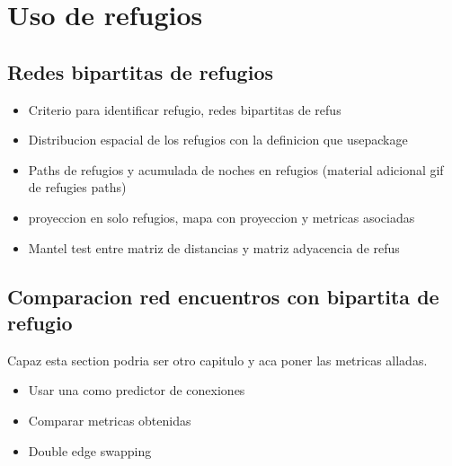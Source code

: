 \chapter{Uso de refugios}
\section{Redes bipartitas de refugios}
\begin{itemize}
    \item Criterio para identificar refugio, redes bipartitas de refus
    \item Distribucion espacial de los refugios con la definicion que usepackage
    \item Paths de refugios y acumulada de noches en refugios (material adicional gif de refugies paths)
    \item proyeccion en solo refugios, mapa con proyeccion y metricas asociadas 
    \item Mantel test entre matriz de distancias y matriz adyacencia de refus 
\end{itemize}
\section{Comparacion red encuentros con bipartita de refugio}
Capaz esta section podria ser otro capitulo y aca poner las metricas alladas.
\begin{itemize}
    \item Usar una como predictor de conexiones 
    \item Comparar metricas obtenidas 
    \item Double edge swapping 
\end{itemize}